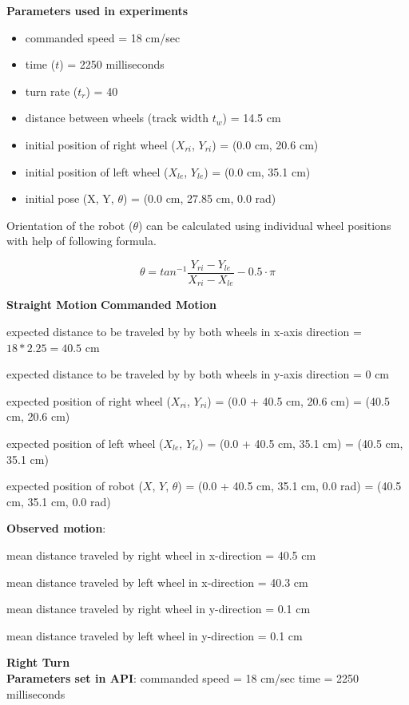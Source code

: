 \textbf{Parameters used in experiments}
\begin{itemize}
	\item commanded speed = 18 cm/sec
	\item time ($t$) = 2250 milliseconds
	\item turn rate ($t_r$) = 40 
	\item distance between wheels (track width $t_w$) = 14.5 cm 
	\item initial position of right wheel ($X_{ri}$, $Y_{ri}$) = (0.0 cm, 20.6 cm) 
	\item initial position of left wheel ($X_{le}$, $Y_{le}$) = (0.0 cm, 35.1 cm)
	\item initial pose (X, Y, $\theta$) = (0.0 cm, 27.85 cm, 0.0 rad)
\end{itemize}
\par Orientation of the robot ($\theta$) can be calculated using individual wheel positions with help of following formula. 

$$\theta = tan^{-1}\frac{Y_{ri} - Y_{le}}{X_{ri} - X_{le}} - 0.5\cdot{\pi}$$

\textbf{Straight Motion}
\textbf{Commanded Motion}

expected distance to be traveled by by both wheels in x-axis direction = $ 18 * 2.25 = 40.5$ cm 
	
expected distance to be traveled by by both wheels in y-axis direction = $0$ cm

expected position of right wheel ($X_{ri}$, $Y_{ri}$) = (0.0 + 40.5 cm, 20.6 cm) = (40.5 cm, 20.6 cm)

expected position of left wheel ($X_{le}$, $Y_{le}$) = (0.0 + 40.5 cm, 35.1 cm) = (40.5 cm, 35.1 cm)

expected position of robot ($X$, $Y$, $\theta$) = (0.0 + 40.5 cm, 35.1 cm, 0.0 rad) = (40.5 cm, 35.1 cm, 0.0 rad)


	
\textbf{Observed motion}:
	
mean distance traveled by right wheel in x-direction = 40.5 cm

mean distance traveled by left wheel in x-direction = 40.3 cm 

mean distance traveled by right wheel in y-direction = 0.1 cm 

mean distance traveled by left wheel in y-direction = 0.1 cm 
	
\textbf{Right Turn} \\
\textbf{Parameters set in API}: \newline
commanded speed = 18 cm/sec \newline
time = 2250 milliseconds \newline
\\
	
